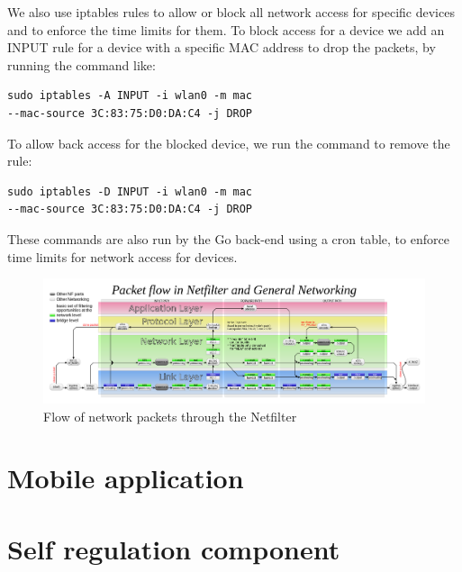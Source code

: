 We also use iptables rules to allow or block all network access for specific devices and to enforce the time limits for them. To block access for a device we add an INPUT rule for a device with a specific MAC address to drop the packets, by running the command like:

\begin{lstlisting}
sudo iptables -A INPUT -i wlan0 -m mac 
--mac-source 3C:83:75:D0:DA:C4 -j DROP
\end{lstlisting}

To allow back access for the blocked device, we run the command to remove the rule:

\begin{lstlisting}
sudo iptables -D INPUT -i wlan0 -m mac 
--mac-source 3C:83:75:D0:DA:C4 -j DROP
\end{lstlisting}

These commands are also run by the Go back-end using a cron table, to enforce time limits for network access for devices.

\begin{figure}[th]
\centering
\includegraphics[width=1\textwidth]{Figures/netfilter-flow}
\decoRule
\caption{Flow of network packets through the Netfilter}
\label{fig:netfilter-flow}
\end{figure}

\section{Mobile application}

\section{Self regulation component}

